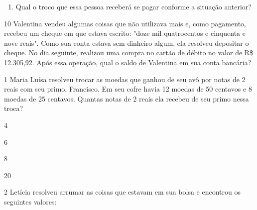 {\begin{enumerate}

\item
  Qual o troco que essa pessoa receberá se pagar conforme a situação anterior?

\end{enumerate}


\num{10} Valentina vendeu algumas coisas que não utilizava mais e, como
pagamento, recebeu um cheque em que estava escrito: "doze mil quatrocentos
e cinquenta e nove reais". Como sua conta estava sem dinheiro algum, ela
resolveu depositar o cheque. No dia seguinte, realizou uma compra no cartão de débito no valor de R\$ 12.305,92. Após essa operação, qual o
saldo de Valentina em sua conta bancária?




\num{1} Maria Luísa resolveu trocar as moedas que ganhou de seu avô por
notas de 2 reais com seu primo, Francisco. Em seu cofre havia 12 moedas de 50 centavos e 8 moedas de 25 centavos. Quantas notas de 2
reais ela recebeu de seu primo nessa troca?

\begin{escolha}
\item
  4
\item
  6
\item
  8
\item
  20
\end{escolha}


\num{2} Letícia resolveu arrumar as coisas que estavam em sua bolsa e
encontrou os seguintes valores:

}
